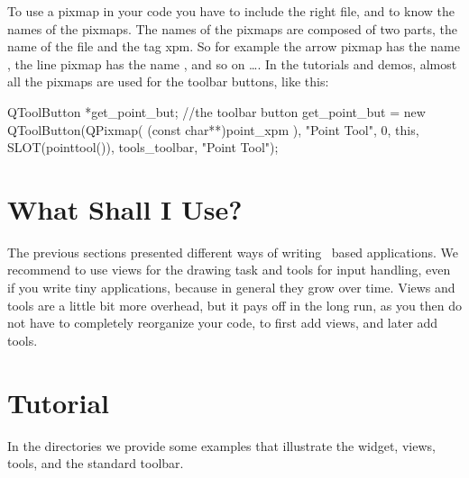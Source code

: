 










To use a pixmap in your code you have to include the right file, and
to know the names of the pixmaps. The names of the pixmaps are
composed of two parts, the name of the file and the tag xpm. So for
example the arrow pixmap has the name , the line
pixmap has the name , and so on \ldots.  In the
tutorials and demos, almost all the pixmaps are used for the toolbar
buttons, like this:

\ccExample
\begin{ccExampleCode}
    QToolButton *get_point_but;	//the toolbar button
    get_point_but =  new QToolButton(QPixmap( (const char**)point_xpm ),
                                     "Point Tool", 
                                     0, 
                                     this, 
                                     SLOT(pointtool()), 
                                     tools_toolbar, 
                                     "Point Tool");
\end{ccExampleCode}



\section{What Shall I Use?}

The previous sections presented different ways of writing \qt\ based 
applications. We recommend to use views for the drawing task and tools
for input handling, even if you write tiny applications, because in general
they grow over time.   Views and tools are a little bit more overhead, but 
it pays off in the long run, as you then do not have to completely
reorganize your code, to first add views, and later add tools. 





\section{Tutorial}

In the directories  we provide some examples
that illustrate the widget, views, tools, and the standard toolbar.








